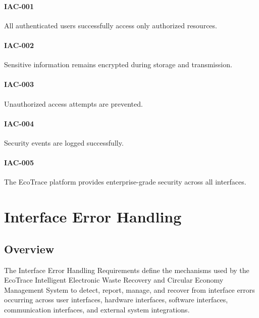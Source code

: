 \paragraph{IAC-001}

All authenticated users successfully access only authorized resources.

\paragraph{IAC-002}

Sensitive information remains encrypted during storage and transmission.

\paragraph{IAC-003}

Unauthorized access attempts are prevented.

\paragraph{IAC-004}

Security events are logged successfully.

\paragraph{IAC-005}

The EcoTrace platform provides enterprise-grade security across all
interfaces.

\section{Interface Error Handling}


\subsection{Overview}

The Interface Error Handling Requirements define the mechanisms used by
the EcoTrace Intelligent Electronic Waste Recovery and Circular Economy
Management System to detect, report, manage, and recover from interface
errors occurring across user interfaces, hardware interfaces, software
interfaces, communication interfaces, and external system integrations.

